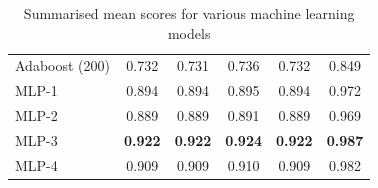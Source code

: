 \begin{table}[H]
\begin{tabular}{|p{5cm}|c|c|c|c|c|}
        Adaboost (200) & 0.732 & 0.731 & 0.736 & 0.732 & 0.849 \\
        MLP-1 & 0.894 & 0.894 & 0.895 & 0.894 & 0.972 \\
        MLP-2 & 0.889 & 0.889 & 0.891 & 0.889 & 0.969 \\
        MLP-3 & \textbf{0.922} & \textbf{0.922} & \textbf{0.924} & \textbf{0.922} & \textbf{0.987} \\
        MLP-4 & 0.909 & 0.909 & 0.910 & 0.909 & 0.982 \\
        \hline
        \end{tabular}
        \caption{Summarised mean scores for various machine learning models}
        \label{tab:summarised_scores}
    \end{table}
    


























































































